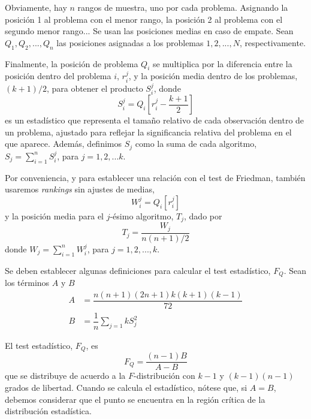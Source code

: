 Obviamente, hay $n$ rangos de muestra, uno por cada problema. 
Asignando la posición 1 al problema con el menor rango, la posición 2 al problema con el segundo menor rango... 
Se usan las posiciones medias en caso de empate. 
Sean $Q_1, Q_2, ..., Q_n$ las posiciones asignadas a los problemas $1,2,...,N$, respectivamente. 

Finalmente, la posición de problema $Q_i$ se multiplica por la diferencia entre la posición dentro del problema $i$, $r_i^j$, y la posición media dentro de los problemas, $(k+1)/2$, para obtener el producto $S_i^j$, donde
\begin{equation}
S_i^j = Q_i \left[ r_i^j - \dfrac{k+1}{2} \right]
\label{eq:4.39}
\end{equation}
es un estadístico que representa el tamaño relativo de cada observación dentro de un problema, ajustado para reflejar la significancia relativa del problema en el que aparece. 
Además, definimos $S_j$ como la suma de cada algoritmo, $S_j = \sum_{i=1}^n S_i^j$, para $j=1,2,...k$.

Por conveniencia, y para establecer una relación con el test de Friedman, también usaremos \textit{rankings} sin ajustes de medias,
\begin{equation}
W_i^j = Q_i \left[ r_i^j \right]
\label{eq:4.40}
\end{equation}
y la posición media para el $j$-ésimo algoritmo, $T_j$, dado por
\begin{equation}
T_j = \dfrac{W_j}{n(n+1)/2}
\label{eq:4.41}
\end{equation}
donde $W_j = \sum_{i=1}^n W_i^j$, para $j=1,2,...,k$.

Se deben establecer algunas definiciones para calcular el test estadístico, $F_Q$. 
Sean los términos $A$ y $B$
\begin{equation}
\begin{aligned}
A & = \dfrac{n(n+1)(2n+1)k(k+1)(k-1)}{72} \\
B & = \dfrac{1}{n} \sum_{j=1}kS_j^2
\end{aligned}
\label{eq:4.42}
\end{equation}

El test estadístico, $F_Q$, es
\begin{equation}
F_Q = \dfrac{(n-1)B}{A-B}
\label{eq:4.43}
\end{equation}
que se distribuye de acuerdo a la $F$-distribución con $k-1$ y $(k-1)(n-1)$ grados de libertad. 
Cuando se calcula el estadístico, nótese que, si $A=B$, debemos considerar que el punto se encuentra en la región crítica de la distribución estadística. 

